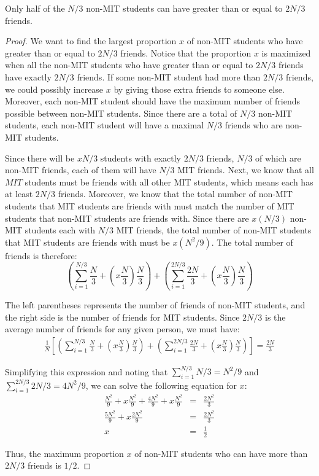 \documentclass{6046}
\begin{document}
\begin{theorem}
Only half of the $N/3$ non-MIT students can have greater than or equal to $2N/3$ friends. 
\end{theorem}

\begin{proof}
We want to find the largest proportion $x$ of non-MIT students who have greater than or equal to $2N/3$ friends. Notice that the proportion $x$ is maximized when all the non-MIT students who have greater than or equal to $2N/3$ friends have exactly $2N/3$ friends. If some non-MIT student had more than $2N/3$ friends, we could possibly increase $x$ by giving those extra friends to someone else. Moreover, each non-MIT student should have the maximum number of friends possible between non-MIT students. Since there are a total of $N/3$ non-MIT students, each non-MIT student will have a maximal $N/3$ friends who are non-MIT students. 

Since there will be $x N/3$ students with exactly $2N/3$ friends, $N/3$ of which are non-MIT friends, each of them will have $N/3$ MIT friends. Next, we know that all $MIT$ students must be friends with all other MIT students, which means each has at least $2N/3$ friends. Moreover, we know that the total number of non-MIT students that MIT students are friends with must match the number of MIT students that non-MIT students are friends with. Since there are $x (N/3)$ non-MIT students each with $N/3$ MIT friends, the total number of non-MIT students that MIT students are friends with must be $x (N^2/9)$. The total number of friends is therefore:
\begin{equation}
 \left( \sum_{i=1}^{N/3} \frac{N}{3} + \left( x \frac{N}{3} \right) \frac{N}{3} \right) + \left( \sum_{i=1}^{2N/3} \frac{2N}{3} + \left( x \frac{N}{3} \right) \frac{N}{3} \right) 
\end{equation}

The left parentheses represents the number of friends of non-MIT students, and the right side is the number of friends for MIT students. Since $2N/3$ is the average number of friends for any given person, we must have:
\begin{eqnarray}
 \frac{1}{N} \left[\left( \sum_{i=1}^{N/3} \frac{N}{3} + \left( x \frac{N}{3} \right) \frac{N}{3} \right) + \left( \sum_{i=1}^{2N/3} \frac{2N}{3} + \left( x \frac{N}{3} \right) \frac{N}{3} \right)  \right] = \frac{2N}{3}
\end{eqnarray}

Simplifying this expression and noting that $\sum_{i=1}^{N/3} N/3 = N^2/9$ and $\sum_{i=1}^{2N/3} 2N/3 = 4N^2/9$, we can solve the following equation for $x$:
\begin{eqnarray}
\frac{N^2}{9} + x \frac{N^2}{9} + \frac{4 N^2}{9} + x \frac{N^2}{9} &=& \frac{2 N^2}{3} \\
\frac{5N^2}{9} + x \frac{2N^2}{9} &=& \frac{2N^2}{3} \\
x &=& \frac{1}{2}
\end{eqnarray}

Thus, the maximum proportion $x$ of non-MIT students who can have more than $2N/3$ friends is $1/2$. 
\end{proof}
\end{document}
